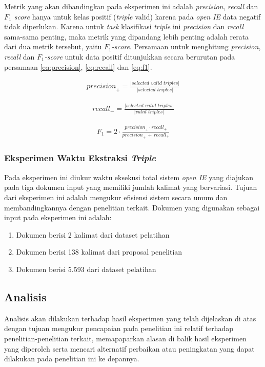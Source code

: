 Metrik yang akan dibandingkan pada eksperimen ini adalah \textit{precision}, \textit{recall} dan \textit{$F_1$ score} hanya untuk kelas positif (\textit{triple} valid) karena pada \textit{open IE} data negatif tidak diperlukan. Karena untuk \textit{task} klasifikasi \textit{triple} ini \textit{precision} dan \textit{recall} sama-sama penting, maka metrik yang dipandang lebih penting adalah rerata dari dua metrik tersebut, yaitu \textit{$F_1$-score}. Persamaan untuk menghitung \textit{precision}, \textit{recall} dan \textit{$F_1$-score} untuk data positif ditunjukkan secara berurutan pada persamaan \ref{eq:precision}, \ref{eq:recall} dan \ref{eq:f1}.

\noindent \begin{align}\label{eq:precision}
	\textit{precision}_+ = \frac{|\textit{selected valid triples}|}{|\textit{selected triples}|}
\end{align}

\noindent \begin{align}\label{eq:recall}
	\textit{recall}_+ = \frac{|\textit{selected valid triples}|}{|\textit{valid triples}|}
\end{align}

\noindent \begin{align}\label{eq:f1}
	F_{1} = 2 \cdot \frac{\textit{precision}_+ \cdot \textit{recall}_+ }{ \textit{precision}_+ \, + \, \textit{recall}_+}
\end{align}


\subsubsection{Eksperimen Waktu Ekstraksi \textit{Triple}}

Pada eksperimen ini diukur waktu eksekusi total sistem \textit{open IE} yang diajukan pada tiga dokumen input yang memiliki jumlah kalimat yang bervariasi. Tujuan dari eksperimen ini adalah mengukur efisiensi sistem secara umum dan membandingkannya dengan penelitian terkait. Dokumen yang digunakan sebagai input pada eksperimen ini adalah:

\begin{enumerate}
\item Dokumen berisi 2 kalimat dari dataset pelatihan
\item Dokumen berisi 138 kalimat dari proposal penelitian
\item Dokumen berisi 5.593 dari dataset pelatihan
\end{enumerate}

\subsection{Analisis}

Analisis akan dilakukan terhadap hasil eksperimen yang telah dijelaskan di atas dengan tujuan mengukur pencapaian pada penelitian ini relatif terhadap penelitian-penelitian terkait, memapaparkan alasan di balik hasil eksperimen yang diperoleh serta mencari alternatif perbaikan atau peningkatan yang dapat dilakukan pada penelitian ini ke depannya.